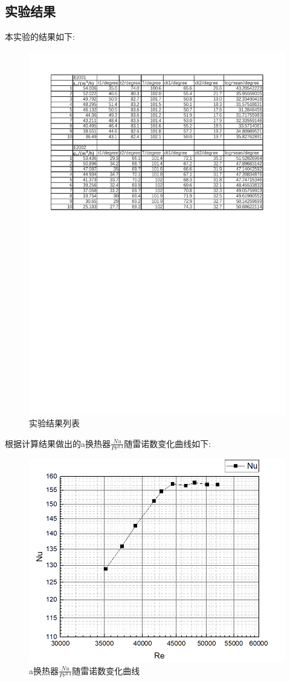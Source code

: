 \documentclass[a4paper,UTF8]{ctexrep}
\theoremstyle{plain}
\theoremstyle{definition}
\numberwithin{equation}{chapter}
\begin{document}
\subsection{实验结果}
        本实验的结果如下:
\begin{figure}[h]
    \centering
    \includegraphics[width=0.7\linewidth]{7th.pdf}
    \caption{实验结果列表}
    \label{fig:enter-label}
\end{figure}
\newpage
根据计算结果做出的a换热器$\frac{Nu}{Pr^{0.4}}$随雷诺数变化曲线如下:
\begin{figure}[h]
    \centering
    \includegraphics[width=0.6\linewidth]{image.png}
    \caption{a换热器$\frac{Nu}{Pr^{0.4}}$随雷诺数变化曲线}
    \label{fig:enter-label}
\end{figure}
\end{document}
